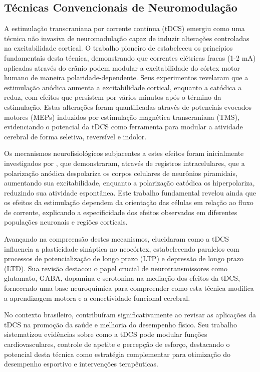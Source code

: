 \subsection{Técnicas Convencionais de Neuromodulação}
A estimulação transcraniana por corrente contínua (tDCS) emergiu como uma técnica não invasiva de neuromodulação capaz de induzir alterações controladas na excitabilidade cortical. O trabalho pioneiro de  estabeleceu os princípios fundamentais desta técnica, demonstrando que correntes elétricas fracas (1-2 mA) aplicadas através do crânio podem modular a excitabilidade do córtex motor humano de maneira polaridade-dependente. Seus experimentos revelaram que a estimulação anódica aumenta a excitabilidade cortical, enquanto a catódica a reduz, com efeitos que persistem por vários minutos após o término da estimulação. Estas alterações foram quantificadas através de potenciais evocados motores (MEPs) induzidos por estimulação magnética transcraniana (TMS), evidenciando o potencial da tDCS como ferramenta para modular a atividade cerebral de forma seletiva, reversível e indolor.

Os mecanismos neurofisiológicos subjacentes a estes efeitos foram inicialmente investigados por , que demonstraram, através de registros intracelulares, que a polarização anódica despolariza os corpos celulares de neurônios piramidais, aumentando sua excitabilidade, enquanto a polarização catódica os hiperpolariza, reduzindo sua atividade espontânea. Este trabalho fundamental revelou ainda que os efeitos da estimulação dependem da orientação das células em relação ao fluxo de corrente, explicando a especificidade dos efeitos observados em diferentes populações neuronais e regiões corticais.

Avançando na compreensão destes mecanismos,  elucidaram como a tDCS influencia a plasticidade sináptica no neocórtex, estabelecendo paralelos com processos de potencialização de longo prazo (LTP) e depressão de longo prazo (LTD). Sua revisão destacou o papel crucial de neurotransmissores como glutamato, GABA, dopamina e serotonina na mediação dos efeitos da tDCS, fornecendo uma base neuroquímica para compreender como esta técnica modifica a aprendizagem motora e a conectividade funcional cerebral.

No contexto brasileiro,  contribuíram significativamente ao revisar as aplicações da tDCS na promoção da saúde e melhoria do desempenho físico. Seu trabalho sistematizou evidências sobre como a tDCS pode modular funções cardiovasculares, controle de apetite e percepção de esforço, destacando o potencial desta técnica como estratégia complementar para otimização do desempenho esportivo e intervenções terapêuticas.

